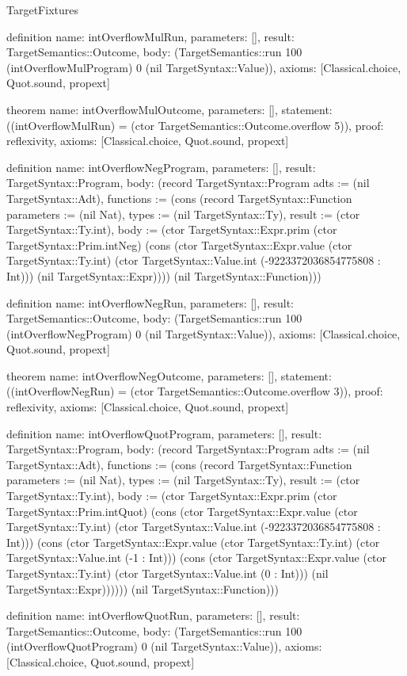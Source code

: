 \begin{lexlean}{TargetFixtures}
\begin{semanticmodule}
definition{
  name: intOverflowMulRun,
  parameters: [],
  result: TargetSemantics::Outcome,
  body: (TargetSemantics::run 100 (intOverflowMulProgram) 0 (nil TargetSyntax::Value)),
  axioms: [Classical.choice, Quot.sound, propext]
}

theorem{
  name: intOverflowMulOutcome,
  parameters: [],
  statement: ((intOverflowMulRun) = (ctor TargetSemantics::Outcome.overflow 5)),
  proof: reflexivity{},
  axioms: [Classical.choice, Quot.sound, propext]
}

definition{
  name: intOverflowNegProgram,
  parameters: [],
  result: TargetSyntax::Program,
  body: (record TargetSyntax::Program {adts := (nil TargetSyntax::Adt), functions := (cons (record TargetSyntax::Function {parameters := (nil Nat), types := (nil TargetSyntax::Ty), result := (ctor TargetSyntax::Ty.int), body := (ctor TargetSyntax::Expr.prim (ctor TargetSyntax::Prim.intNeg) (cons (ctor TargetSyntax::Expr.value (ctor TargetSyntax::Ty.int) (ctor TargetSyntax::Value.int (-9223372036854775808 : Int))) (nil TargetSyntax::Expr)))}) (nil TargetSyntax::Function))})
}

definition{
  name: intOverflowNegRun,
  parameters: [],
  result: TargetSemantics::Outcome,
  body: (TargetSemantics::run 100 (intOverflowNegProgram) 0 (nil TargetSyntax::Value)),
  axioms: [Classical.choice, Quot.sound, propext]
}

theorem{
  name: intOverflowNegOutcome,
  parameters: [],
  statement: ((intOverflowNegRun) = (ctor TargetSemantics::Outcome.overflow 3)),
  proof: reflexivity{},
  axioms: [Classical.choice, Quot.sound, propext]
}

definition{
  name: intOverflowQuotProgram,
  parameters: [],
  result: TargetSyntax::Program,
  body: (record TargetSyntax::Program {adts := (nil TargetSyntax::Adt), functions := (cons (record TargetSyntax::Function {parameters := (nil Nat), types := (nil TargetSyntax::Ty), result := (ctor TargetSyntax::Ty.int), body := (ctor TargetSyntax::Expr.prim (ctor TargetSyntax::Prim.intQuot) (cons (ctor TargetSyntax::Expr.value (ctor TargetSyntax::Ty.int) (ctor TargetSyntax::Value.int (-9223372036854775808 : Int))) (cons (ctor TargetSyntax::Expr.value (ctor TargetSyntax::Ty.int) (ctor TargetSyntax::Value.int (-1 : Int))) (cons (ctor TargetSyntax::Expr.value (ctor TargetSyntax::Ty.int) (ctor TargetSyntax::Value.int (0 : Int))) (nil TargetSyntax::Expr)))))}) (nil TargetSyntax::Function))})
}

definition{
  name: intOverflowQuotRun,
  parameters: [],
  result: TargetSemantics::Outcome,
  body: (TargetSemantics::run 100 (intOverflowQuotProgram) 0 (nil TargetSyntax::Value)),
  axioms: [Classical.choice, Quot.sound, propext]
}


\end{semanticmodule}
\end{lexlean}
